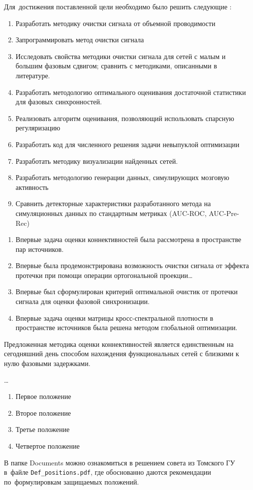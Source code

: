 Для~достижения поставленной цели необходимо было решить следующие {\tasks}:
\begin{enumerate}
  \item Разработать методику очистки сигнала от объемной проводимости
  \item Запрограммировать метод очистки сигнала
  \item Исследовать свойства методики очистки сигнала
        для сетей с малым и большим фазовым сдвигом;
        сравнить с методиками, описанными в литературе.
  \item Разработать методологию оптимального оценивания достаточной статистики
        для фазовых синхронностей.
  \item Реализовать алгоритм оценивания, позволяющий использовать спарсную регуляризацию
  \item Разработать код для численного решения задачи невыпуклой оптимизации
  \item Разработать методику визуализации найденных сетей.
  \item Разработать методологию генерации данных, симулирующих мозговую активность
  \item Сравнить детекторные характеристики разработанного метода на симуляционных данных
        по стандартным метриках (AUC-ROC, AUC-Pre-Rec)
\end{enumerate}


{\novelty}
\begin{enumerate}
  \item Впервые задача оценки коннективностей была рассмотрена в пространстве пар источников.
  \item Впервые была продемонстрирована возможность очистки сигнала от эффекта протечки 
        при помощи операции ортогональной проекции\ldots
  \item Впервые был сформулирован критерий оптимальной очистик от протечки сигнала
      для оценки фазовой синхронизации.
  \item Впервые задача оценки матрицы кросс-спектральной плотности в пространстве источников
        была решена методом глобальной оптимизации.
\end{enumerate}

{\influence} 
Предложенная методика оценки коннективностей является единственным
на сегодняшний день способом нахождения функциональных сетей с близкими к нулю
фазовыми задержками.

{\methods} \ldots

{}
\begin{enumerate}
  \item Первое положение
  \item Второе положение
  \item Третье положение
  \item Четвертое положение
\end{enumerate}
В папке Documents можно ознакомиться в решением совета из Томского ГУ
в~файле \verb+Def_positions.pdf+, где обоснованно даются рекомендации
по~формулировкам защищаемых положений.

